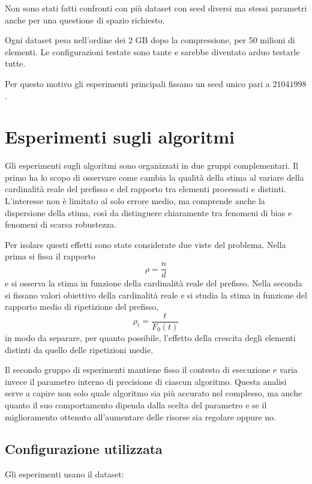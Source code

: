 Non sono stati fatti confronti con pi\`u dataset con seed diversi ma stessi parametri
anche per una questione di spazio richiesto. 

Ogni dataset pesa nell'ordine dei 2 GB dopo la compressione, per 50 milioni di elementi.
Le configurazioni testate sono tante e sarebbe diventato arduo testarle tutte.

Per questo motivo gli esperimenti principali fissano un seed unico pari a
\(21041998\).

\section{Esperimenti sugli algoritmi}
Gli esperimenti sugli algoritmi sono organizzati in due gruppi complementari.
  Il primo ha lo scopo di osservare come cambia la qualità della stima al variare
  della cardinalità reale del prefisso e del rapporto tra elementi processati e
  distinti. L'interesse non è limitato al solo errore medio, ma comprende anche
  la dispersione della stima, così da distinguere chiaramente tra fenomeni di
  bias e fenomeni di scarsa robustezza.

  Per isolare questi effetti sono state considerate due viste del problema. Nella
  prima si fissa il rapporto
  \[
  \rho=\frac{n}{d}
  \]
  e si osserva la stima in funzione della cardinalità reale del prefisso. Nella
  seconda si fissano valori obiettivo della cardinalità reale e si studia la
  stima in funzione del rapporto medio di ripetizione del prefisso,
  \[
  \rho_t=\frac{t}{F_0(t)}
  \]
  in modo da separare, per quanto possibile, l'effetto della crescita degli elementi distinti
  da quello delle ripetizioni medie.

  Il secondo gruppo di esperimenti mantiene fisso il contesto di esecuzione e
  varia invece il parametro interno di precisione di ciascun algoritmo. Questa
  analisi serve a capire non solo quale algoritmo sia più accurato nel complesso,
  ma anche quanto il suo comportamento dipenda dalla scelta del parametro e se il
  miglioramento ottenuto all'aumentare delle risorse sia regolare oppure no.
\subsection{Configurazione utilizzata}

Gli esperimenti usano il dataset:
\begin{center}
\small
{}
\end{center}

